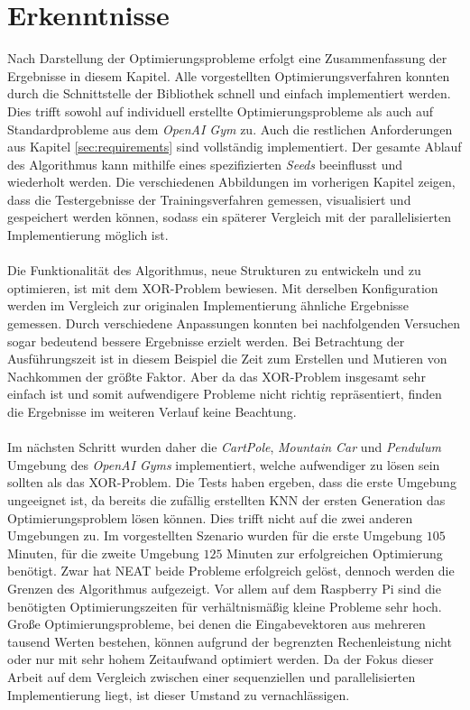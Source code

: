 \section{Erkenntnisse}
\label{sec:analysis_results}
Nach Darstellung der Optimierungsprobleme erfolgt eine Zusammenfassung der Ergebnisse in diesem Kapitel. Alle vorgestellten Optimierungsverfahren konnten durch die Schnittstelle der Bibliothek schnell und einfach implementiert werden. Dies trifft sowohl auf individuell erstellte Optimierungsprobleme als auch auf Standardprobleme aus dem \emph{OpenAI Gym} zu. Auch die restlichen Anforderungen aus Kapitel \ref{sec:requirements} sind vollständig implementiert. Der gesamte Ablauf des Algorithmus kann mithilfe eines spezifizierten \emph{Seeds} beeinflusst und wiederholt werden. Die verschiedenen Abbildungen im vorherigen Kapitel zeigen, dass die Testergebnisse der Trainingsverfahren gemessen, visualisiert und gespeichert werden können, sodass ein späterer Vergleich mit der parallelisierten Implementierung möglich ist.
\\\\
Die Funktionalität des Algorithmus, neue Strukturen zu entwickeln und zu optimieren, ist mit dem XOR-Problem bewiesen. Mit derselben Konfiguration werden im Vergleich zur originalen Implementierung ähnliche Ergebnisse gemessen. Durch verschiedene Anpassungen konnten bei nachfolgenden Versuchen sogar bedeutend bessere Ergebnisse erzielt werden. Bei Betrachtung der Ausführungszeit ist in diesem Beispiel die Zeit zum Erstellen und Mutieren von Nachkommen der größte Faktor. Aber da das XOR-Problem insgesamt sehr einfach ist und somit aufwendigere Probleme nicht richtig repräsentiert, finden die Ergebnisse im weiteren Verlauf keine Beachtung.
\\\\
Im nächsten Schritt wurden daher die \emph{CartPole}, \emph{Mountain Car} und \emph{Pendulum} Umgebung des \emph{OpenAI Gyms} implementiert, welche aufwendiger zu lösen sein sollten als das XOR-Problem. Die Tests haben ergeben, dass die erste Umgebung ungeeignet ist, da bereits die zufällig erstellten \ac{KNN} der ersten Generation das Optimierungsproblem lösen können. Dies trifft nicht auf die zwei anderen Umgebungen zu. Im vorgestellten Szenario wurden für die erste Umgebung $105$ Minuten, für die zweite Umgebung $125$ Minuten zur erfolgreichen Optimierung benötigt. Zwar hat \ac{NEAT} beide Probleme erfolgreich gelöst, dennoch werden die Grenzen des Algorithmus aufgezeigt. Vor allem auf dem Raspberry Pi sind die benötigten Optimierungszeiten für verhältnismäßig kleine Probleme sehr hoch. Große Optimierungsprobleme, bei denen die Eingabevektoren aus mehreren tausend Werten bestehen, können aufgrund der begrenzten Rechenleistung nicht oder nur mit sehr hohem Zeitaufwand optimiert werden. Da der Fokus dieser Arbeit auf dem Vergleich zwischen einer sequenziellen und parallelisierten Implementierung liegt, ist dieser Umstand zu vernachlässigen.
